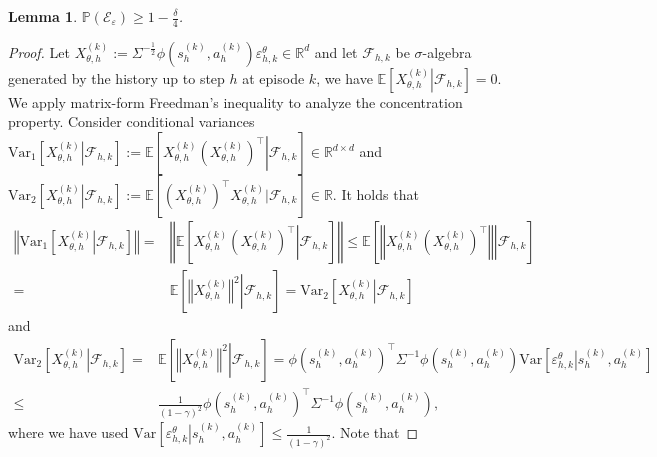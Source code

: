 \documentclass{article}
\newtheorem{lemma}{Lemma}[section]
\numberwithin{equation}{section}
\begin{document}
\begin{lemma}
\label{eps_homo}
$\mathbb{P}(\mathcal{E}_{\varepsilon}) \geq 1-\frac{\delta}{4}$. 
\end{lemma}
\begin{proof}
Let $X_{\theta,h}^{(k)}:=\Sigma^{-\frac{1}{2}}\phi\left(s_h^{(k)},a_h^{(k)}\right)\varepsilon_{h,k}^\theta\in\mathbb{R}^d$ and let $\mathcal{F}_{h,k}$ be $\sigma$-algebra generated by the history up to step $h$ at episode $k$, we have $\mathbb{E}\left[\left.X_{\theta,h}^{(k)}\right\vert\mathcal{F}_{h,k}\right]=0$. We apply matrix-form Freedman's inequality to analyze the concentration property. Consider conditional variances $\textrm{Var}_1\left[\left.X_{\theta,h}^{(k)}\right\vert\mathcal{F}_{h,k}\right]:=\mathbb{E}\left[\left.X_{\theta,h}^{(k)} \left(X_{\theta,h}^{(k)}\right)^\top\right\vert\mathcal{F}_{h,k}\right]\in\mathbb{R}^{d\times d}$ and $\textrm{Var}_2\left[\left.X_{\theta,h}^{(k)}\right\vert\mathcal{F}_{h,k}\right]:=\mathbb{E} \left[\left(X_{\theta,h}^{(k)}\right)^\top X_{\theta,h}^{(k)}\vert\mathcal{F}_{h,k}\right]\in\mathbb{R}$. It holds that
\begin{align*} 
    \left\Vert\textrm{Var}_1\left[\left.X_{\theta,h}^{(k)}\right\vert\mathcal{F}_{h,k}\right]\right\Vert=&\left\Vert\mathbb{E}\left[\left.X_{\theta,h}^{(k)}\left(X_{\theta,h}^{(k)}\right)^\top\right\vert\mathcal{F}_{h,k}\right]\right\Vert\leq\mathbb{E}\left[\left.\left\Vert X_{\theta,h}^{(k)}\left(X_{\theta,h}^{(k)}\right)^\top\right\Vert\right\vert\mathcal{F}_{h,k}\right]\\
    =&\mathbb{E}\left[\left.\left\Vert X_{\theta,h}^{(k)}\right\Vert^2\right\vert\mathcal{F}_{h,k}\right]= \textrm{Var}_2\left[\left.X_{\theta,h}^{(k)}\right\vert\mathcal{F}_{h,k}\right] 
\end{align*}
and
\begin{align*} 
    \textrm{Var}_2\left[\left.X_{\theta,h}^{(k)}\right\vert\mathcal{F}_{h,k}\right]=&\mathbb{E}\left[\left.\left\Vert X_{\theta,h}^{(k)}\right\Vert^2\right\vert\mathcal{F}_{h,k}\right]=\phi\left(s_h^{(k)},a_h^{(k)}\right)^\top\Sigma^{-1}\phi\left(s_h^{(k)},a_h^{(k)}\right)\textrm{Var}\left[\left.\varepsilon_{h,k}^\theta\right\vert s_h^{(k)},a_h^{(k)}\right]\\
    \leq&\frac{1}{(1-\gamma)^2}\phi\left(s_h^{(k)},a_h^{(k)}\right)^\top\Sigma^{-1}\phi\left(s_h^{(k)},a_h^{(k)}\right), 
\end{align*}
where we have used $\textrm{Var}\left[\left.\varepsilon_{h,k}^\theta\right\vert s_h^{(k)},a_h^{(k)} \right]\leq\frac{1}{(1-\gamma)^2}$. Note that

\end{proof}
\end{document}
